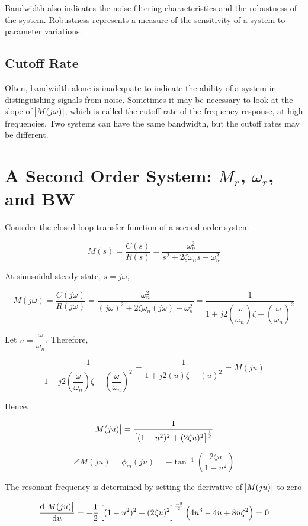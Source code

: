 \documentclass[
  14pt,
  a4paper,
  oneside,
  open=any,
  a4paper,
  14pt]{report}
\begin{document}
Bandwidth also indicates the noise-filtering characteristics and the
robustness of the system. Robustness represents a measure of the
sensitivity of a system to parameter variations.

\subsection{Cutoff Rate}\label{cutoff-rate}

Often, bandwidth alone is inadequate to indicate the ability of a system
in distinguishing signals from noise. Sometimes it may be necessary to
look at the slope of \(\abs{M(j\omega)}\), which is called the cutoff
rate of the frequency response, at high frequencies. Two systems can
have the same bandwidth, but the cutoff rates may be different.

\section{\texorpdfstring{A Second Order System: \(M_r\), \(\omega_r\),
and
BW}{A Second Order System: M\_r, \textbackslash omega\_r, and BW}}\label{a-second-order-system-m_r-omega_r-and-bw}

Consider the closed loop transfer function of a second-order system

\[
    M(s) = \dfrac{C(s)}{R(s)} = \dfrac{\omega_n^2}{s^2 + 2\zeta\omega_n s + \omega_n^2}
\]

At sinusoidal steady-state, \(s=j\omega\),

\[
    M(j\omega) = \dfrac{C(j\omega)}{R(j\omega)} = \dfrac{\omega_n^2}{(j\omega)^2 + 2\zeta\omega_n(j\omega) + \omega_n^2} = \dfrac{1}{1+j2 \left(\dfrac{\omega}{\omega_n}\right)\zeta - \left(\dfrac{\omega}{\omega_n}\right)^2}
\]

Let \(u = \dfrac{\omega}{\omega_n}\). Therefore,

\[
    \dfrac{1}{1+j2 \left(\dfrac{\omega}{\omega_n}\right)\zeta - \left(\dfrac{\omega}{\omega_n}\right)^2} = \dfrac{1}{1+j2(u)\zeta - (u)^2} = M(ju)
\]

Hence,

\[
    \abs{M(ju)} = \dfrac{1}{\left[(1-u^2)^2 + (2\zeta u)^2 \right]^{\frac{1}{2}}}
\]

\[
    \angle M(ju) = \phi_m(ju) = -\tan^{-1} \left(\dfrac{2\zeta u}{1-u^2} \right)
\]

The resonant frequency is determined by setting the derivative of
\(\abs{M(ju)}\) to zero

\[
    \odv{\abs{M(ju)}}{u} = -\dfrac{1}{2} \left[(1-u^2)^2 +(2\zeta u)^2 \right]^{\frac{-3}{2}} \left(4u^3 -4u+8u\zeta^2 \right) = 0
\]
\end{document}

